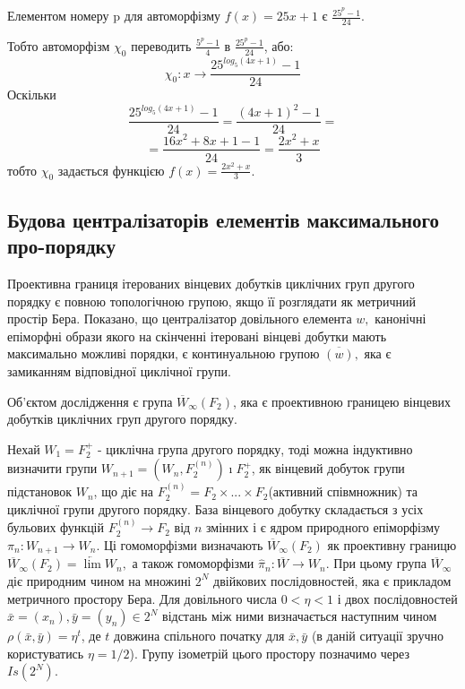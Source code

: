 \documentclass[a4paper,12pt]{article} \usepackage{a4wide}
\numberwithin{equation}{subsection}
\begin{document}
 Елементом номеру p для автоморфізму $f(x)=25x+1$ є $\frac{25^p-1}{24}$.

 Тобто автоморфізм $\chi_0$ переводить  $\frac{5^p-1}{4}$ в $\frac{25^p-1}{24}$, або:
$$\chi_0:x\rightarrow \frac{25^{log_5{(4x+1)}}-1}{24}$$
 Оскільки $$\frac{25^{log_5{(4x+1)}}-1}{24}=\frac{(4x+1)^2-1}{24}=$$
 $$=\frac{16x^2+8x+1-1}{24}=\frac{2x^2+x}{3}$$
тобто $\chi_0$ задається функцією $f(x)=\frac{2x^2+x}{3}$.


 \subsection{Будова централізаторів елементів максимального про-порядку}

 Проективна границя ітерованих вінцевих  добутків циклічних груп другого порядку є повною топологічною групою, якщо її
розглядати як метричний простір Бера. Показано, що централізатор  довільного елемента $w,$ канонічні епіморфні образи
якого на  скінченні ітеровані вінцеві добутки мають максимально можливі порядки, є континуальною групою
$\overline{(w)},$ яка є замиканням відповідної циклічної групи.


Об'єктом дослідження  є група $\overline{W}_\infty(F_2)$, яка є проективною границею вінцевих
 добутків циклічних груп другого порядку.

 Нехай $W_1=F_2^{+}$ - циклічна група другого порядку, тоді
 можна індуктивно визначити групи $W_{n+1}=(W_n,F_2^{(n)})\imath
 F_2^+$, як вінцевий добуток групи підстановок $W_n$, що діє на
  $F_2^{(n)}=F_2\times ...\times F_2$(активний співмножник)
  та циклічної групи другого порядку. База вінцевого добутку
  складається з усіх бульових функцій $F_2^{(n)}\rightarrow F_2$ від $n$
  змінних і є ядром
  природного епіморфізму $\pi_n:W_{n+1}\rightarrow W_n$. Ці
  гомоморфізми визначають $ \overline{W}_\infty (F_2)$
  як проективну границю $ \overline{W}_\infty (F_2) = \underleftarrow {\lim} W_n, $
  а також гомоморфізми $\hat{\pi}_n: \overline{W} \to W_n.$
  При цьому група
  $\overline{W}_\infty$
  діє природним чином на множині $2^N $  двійкових послідовностей, яка
  є прикладом метричного простору Бера. Для довільного числа $ 0<\eta<1$ і
  двох послідовностей $\bar{x}=(x_n),\bar{y}=(y_n)\in 2^N $ відстань між ними визначається наступним
  чином $ \rho(\bar{x},\bar{y})=\eta^t
  $, де $t$  довжина спільного початку для $\bar{x},\bar{y}$
  (в даній ситуації зручно користуватись
  $ \eta=1/2$). Групу ізометрій цього простору позначимо через $Is(2^N).$
\end{document}

